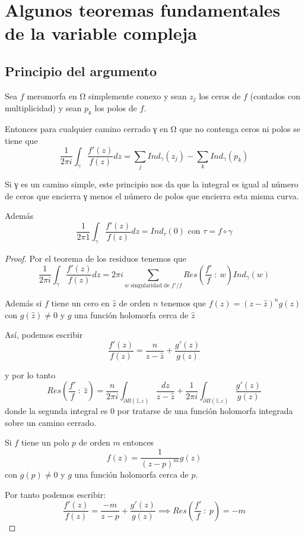 \documentclass{apuntes}
\begin{document}
\chapter{Algunos teoremas fundamentales de la variable compleja}
\section{Principio del argumento}
\begin{theorem}
Sea $f$ meromorfa en Ω simplemente conexo y sean $z_j$ los ceros de $f$ (contados con multiplicidad) y sean $p_k$ los polos de $f$.

Entonces para cualquier camino cerrado γ en Ω que no contenga ceros ni polos se tiene que
\[\frac{1}{2πi}\int_γ\frac{f'(z)}{f(z)}dz = \sum_j Ind_γ(z_j)-\sum_k Ind_γ(p_k)\]

Si γ es un camino simple, este principio nos da que la integral es igual al número de ceros que encierra γ menos el número de polos que encierra esta misma curva.

Además
\[\frac{1}{2π1}\int_γ \frac{f'(z)}{f(z)} dz = Ind_τ(0) \text{ con } τ=f\circ γ\]
\end{theorem}

\begin{proof}
Por el teorema de los residuos tenemos que
\[\frac{1}{2πi}\int_γ \frac{f'(z)}{f(z)}dz = 2πi\sum_{w \text{ singularidad de } f'/f} Res\left(\frac{f'}{f} \ : \ w\right)Ind_γ(w)\]

Además si $f$ tiene un cero en $\hat{z}$ de orden $n$ tenemos que $f(z)=(z-\hat{z})^ng(z)$ con $g(\hat{z})\neq 0$ y $g$ una función holomorfa cerca de $\hat{z}$

Así, podemos escribir
\[\frac{f'(z)}{f(z)}=\frac{n}{z-\hat{z}}+\frac{g'(z)}{g(z)}\]

y por lo tanto
\[Res\left( \frac{f'}{f}\ : \ \hat{z}\right) = \frac{n}{2πi}\int_{\partial B(\hat{z},ε)}\frac{dz}{z-\hat{z}} + \frac{1}{2πi}\int_{\partial B(\hat{z},ε)}\frac{g'(z)}{g(z)}\]
donde la segunda integral es 0 por tratarse de una función holomorfa integrada sobre un camino cerrado.

Si $f$ tiene un polo $p$ de orden $m$ entonces
\[f(z)=\frac{1}{(z-p)^m}g(z)\]
con $g(p)\neq 0$ y $g$ una función holomorfa cerca de $p$.

Por tanto podemos escribir:
\[\frac{f'(z)}{f(z)} = \frac{-m}{z-p}+\frac{g'(z)}{g(z)} \implies Res\left( \frac{f'}{f} \ : \ p \right)=-m\]

\end{proof}
\end{document}
